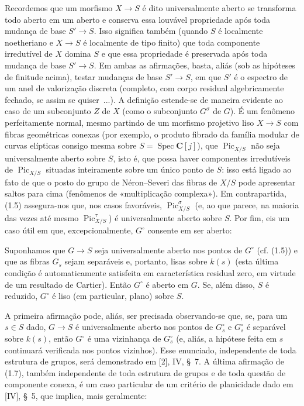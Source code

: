  Recordemos que um morfismo $X\longrightarrow S$ é
dito universalmente aberto se transforma todo aberto em um aberto e conserva
essa louvável propriedade após toda mudança de base $S'\longrightarrow S$.
Isso significa também (quando $S$ é localmente noetheriano e
$X\longrightarrow S$ é localmente de tipo finito) que toda componente
irredutível de $X$ domina $S$ e que essa propriedade é preservada após toda
mudança de base $S'\longrightarrow S$. Em ambas as afirmações, basta, aliás
(sob as hipóteses de finitude acima), testar mudanças de base
$S'\longrightarrow S$, em que $S'$ é o espectro de um anel de valorização
discreta (completo, com corpo residual algebricamente fechado, se assim se
quiser~...). A definição estende-se de maneira evidente ao caso de um
subconjunto $Z$ de $X$ (como o subconjunto $G^\sigma$ de $G$). É um fenômeno
perfeitamente normal, mesmo partindo de um morfismo projetivo liso
$X\longrightarrow S$ com fibras geométricas conexas (por exemplo, o produto
fibrado da família modular de curvas elípticas consigo mesma sobre
$S=\operatorname{Spec}\mathbf C[j]$), que $\operatorname{Pic}_{X/S}$ não
seja universalmente aberto sobre $S$, isto é, que possa haver componentes
irredutíveis de $\operatorname{Pic}_{X/S}$ situadas inteiramente sobre um
único ponto de $S$: isso está ligado ao fato de que o posto do grupo de
Néron--Severi das fibras de $X/S$ pode apresentar saltos para cima (fenômenos
de «multiplicação complexa»). Em contrapartida, (1.5) assegura-nos que, nos
casos favoráveis, $\operatorname{Pic}_{X/S}^\sigma$ (e, ao que parece, na
maioria das vezes até mesmo $\operatorname{Pic}_{X/S}^\tau$) é
universalmente aberto sobre $S$.
Por fim, eis um caso útil em que, excepcionalmente, $G^\circ$ consente em ser
aberto:

 Suponhamos que $G\longrightarrow S$ seja
universalmente aberto nos pontos de $G^\circ$ (cf. (1.5)) e que as fibras
$G_s$ sejam separáveis e, portanto, lisas sobre $k(s)$ (esta última condição é automaticamente satisfeita em
característica residual zero, em virtude de um resultado de Cartier). Então
$G^\circ$ é aberto em $G$. Se, além disso, $S$ é reduzido, $G^\circ$ é liso
(em particular, plano) sobre $S$.

A primeira afirmação pode, aliás, ser precisada observando-se que, se, para um
$s\in S$ dado, $G\longrightarrow S$ é universalmente aberto nos pontos de
$G_s^\circ$ e $G_s^\circ$ é separável sobre $k(s)$, então $G^\circ$ é uma
vizinhança de $G_s^\circ$ (e, aliás, a hipótese feita em $s$ continuará
verificada nos pontos vizinhos). Esse enunciado, independente de toda estrutura
de grupos, será demonstrado em [2], IV, §~7. A última afirmação de (1.7), também
independente de toda estrutura de grupos e de toda questão de componente
conexa, é um caso particular de um critério de planicidade dado em [IV], §~5,
que implica, mais geralmente:

